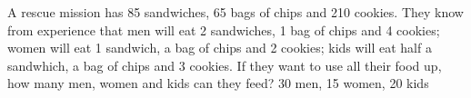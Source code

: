 {A rescue mission has 85 sandwiches, 65 bags of chips and 210 cookies. They know from experience that men will eat 2 sandwiches, 1 bag of chips and 4 cookies; women will eat 1 sandwich, a bag of chips and 2 cookies;  kids will eat half a sandwhich, a bag of chips and 3 cookies. If they want to use all their food up, how many men, women and kids can they feed?}
{30 men, 15 women, 20 kids}